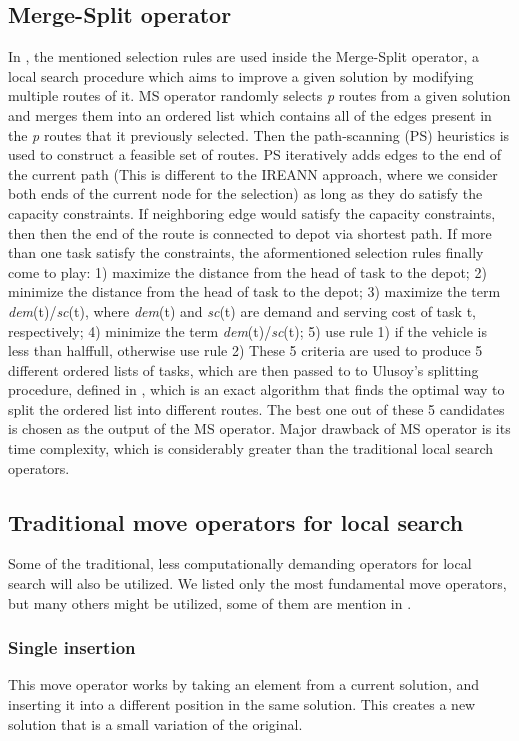 \documentclass[twoside]{ctuthesis}
\theoremstyle{plain}
\theoremstyle{definition}
\theoremstyle{note}
\begin{document}
\subsection{Merge-Split operator}
In \cite{5200351}, the mentioned selection rules are used inside the Merge-Split operator, a local search procedure which aims to improve a given solution by modifying multiple routes of it. MS operator randomly selects \emph{p} routes from a given solution and merges them into an ordered list which contains all of the edges present in the \emph{p} routes that it previously selected. Then the path-scanning (PS) heuristics is used to construct a feasible set of routes. PS iteratively adds edges to the end of the current path (This is different to the IREANN approach, where we consider both ends of the current node for the selection) as long as they do satisfy the capacity constraints. If neighboring edge would satisfy the capacity constraints, then then the end of the route is connected to depot via shortest path. If more than one task satisfy the constraints, the aformentioned selection rules finally come to play: 1) maximize
the distance from the head of task to the depot; 2) minimize
the distance from the head of task to the depot; 3) maximize
the term \emph{dem}(t)/\emph{sc}(t), where \emph{dem}(t) and \emph{sc}(t) are demand
and serving cost of task t, respectively; 4) minimize the term
\emph{dem}(t)/\emph{sc}(t); 5) use rule 1) if the vehicle is less than halffull, otherwise use rule 2)
These 5 criteria are used to produce 5 different ordered lists of tasks, which are then passed to to Ulusoy's splitting procedure, defined in \cite{ULUSOY1985329}, which is an exact algorithm that finds the optimal way to split the ordered list into different routes. The best one out of these 5 candidates is chosen as the output of the MS operator. Major drawback of MS operator is its time complexity, which is considerably greater than the traditional local search operators.

\subsection{Traditional move operators for local search}
Some of the traditional, less computationally demanding operators for local search will also be utilized. We listed only the most fundamental move operators, but many others might be utilized, some of them are mention in \cite{BEULLENS2003629}.
\subsubsection{Single insertion}
This move operator works by taking an element from a current solution, and inserting it into a different position in the same solution. This creates a new solution that is a small variation of the original. 
\end{document}
